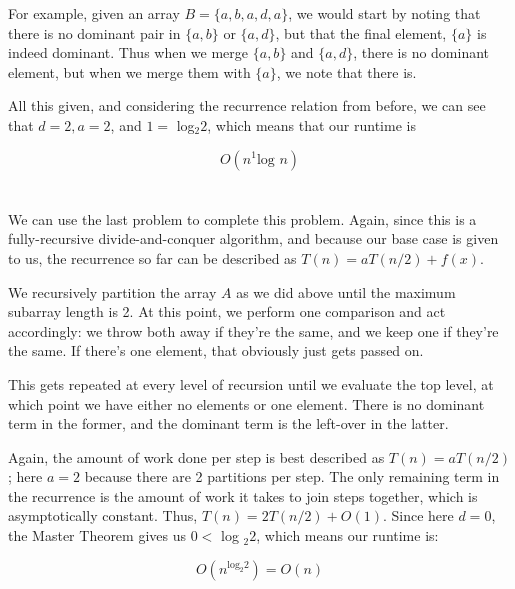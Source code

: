 \documentclass[a4paper]{article}
\begin{document}
For example, given an array $B = \{a, b, a, d, a\}$, we would start by noting that there is no dominant pair in $\{a, b\}$ or $\{a, d\}$, but that the final element, $\{a\}$ is indeed dominant. Thus when we merge $\{a, b\}$ and $\{a, d\}$, there is no dominant element, but when we merge them with $\{a\}$, we note that there is.

All this given, and considering the recurrence relation from before, we can see that $d = 2, a = 2$, and $1 =$ log$_2 2$, which means that our runtime is

\begin{equation}
O(n^1 \mbox{log } n)
\end{equation}

\section{}

We can use the last problem to complete this problem. Again, since this is a fully-recursive divide-and-conquer algorithm, and because our base case is given to us, the recurrence so far can be described as $T(n) = aT(n/2) + f(x)$.

We recursively partition the array $A$ as we did above until the maximum subarray length is 2. At this point, we perform one comparison and act accordingly: we throw both away if they're the same, and we keep one if they're the same. If there's one element, that obviously just gets passed on.

This gets repeated at every level of recursion until we evaluate the top level, at which point we have either no elements or one element. There is no dominant term in the former, and the dominant term is the left-over in the latter.

Again, the amount of work done per step is best described as $T(n) = aT(n/2)$; here $a = 2$ because there are 2 partitions per step. The only remaining term in the recurrence is the amount of work it takes to join steps together, which is asymptotically constant. Thus, $T(n) = 2T(n/2) + O(1)$. Since here $d = 0$, the Master Theorem gives us $0 <$ log $_2 2$, which means our runtime is:

\begin{equation}
O(n^{\mbox{log}_2 2}) = O(n)
\end{equation}
\end{document}

